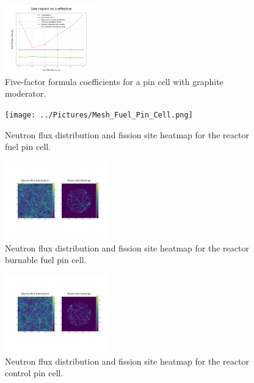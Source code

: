 \documentclass[twocolumn,a4paper,10pt]{article}
\begin{document}
\begin{figure}[ht]
  \centering
  \includegraphics[width=0.35\textwidth]{../Pin_Cell/Graphite.png}
  \caption{Five-factor formula coefficients for a pin cell with graphite moderator.}
  \label{fig:FFFgraphite}
\end{figure}

\begin{figure}[ht]
  \centering
  \texttt{[image: ../Pictures/Mesh\_Fuel\_Pin\_Cell.png]}
  \caption{Neutron flux distribution and fission site heatmap for the reactor fuel pin cell.}
  \label{fig:meshfuel}
\end{figure}

\begin{figure}[ht]
  \centering
  \includegraphics[width=0.4\textwidth]{../Pictures/Mesh_Burnable_Fuel_Pin_Cell.png}
  \caption{Neutron flux distribution and fission site heatmap for the reactor burnable fuel pin cell.}
  \label{fig:meshburn}
\end{figure}

\begin{figure}[ht]
  \centering
  \includegraphics[width=0.4\textwidth]{../Pictures/Mesh_Control_Pin_Cell.png}
  \caption{Neutron flux distribution and fission site heatmap for the reactor control pin cell.}
  \label{fig:meshcont}
\end{figure}
\end{document}
